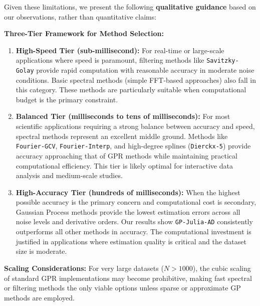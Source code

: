 Given these limitations, we present the following \textbf{qualitative guidance} based on our observations, rather than quantitative claims:

\textbf{Three-Tier Framework for Method Selection:}

\begin{enumerate}
    \item \textbf{High-Speed Tier (sub-millisecond):} For real-time or large-scale applications where speed is paramount, filtering methods like \texttt{Savitzky-Golay} provide rapid computation with reasonable accuracy in moderate noise conditions. Basic spectral methods (simple FFT-based approaches) also fall in this category. These methods are particularly suitable when computational budget is the primary constraint.

    \item \textbf{Balanced Tier (milliseconds to tens of milliseconds):} For most scientific applications requiring a strong balance between accuracy and speed, spectral methods represent an excellent middle ground. Methods like \texttt{Fourier-GCV}, \texttt{Fourier-Interp}, and high-degree splines (\texttt{Dierckx-5}) provide accuracy approaching that of GPR methods while maintaining practical computational efficiency. This tier is likely optimal for interactive data analysis and medium-scale studies.

    \item \textbf{High-Accuracy Tier (hundreds of milliseconds):} When the highest possible accuracy is the primary concern and computational cost is secondary, Gaussian Process methods provide the lowest estimation errors across all noise levels and derivative orders. Our results show \texttt{GP-Julia-AD} consistently outperforms all other methods in accuracy. The computational investment is justified in applications where estimation quality is critical and the dataset size is moderate.
\end{enumerate}

\textbf{Scaling Considerations:} For very large datasets ($N > 1000$), the cubic scaling of standard GPR implementations may become prohibitive, making fast spectral or filtering methods the only viable options unless sparse or approximate GP methods are employed.

